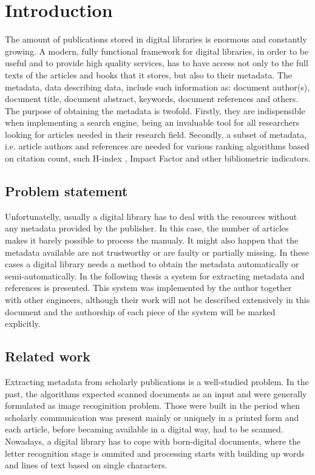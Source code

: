 \chapter{Introduction}
The amount of publications stored in digital libraries is enormous and constantly growing. A modern, fully functional framework for digital libraries, in order to be useful and to provide high quality services, has to have access not only to the full texts of the articles and books that it stores, but also to their metadata. The metadata, data describing data, include such information as: document author(s), document title, document abstract, keywords, document references and others. The purpose of obtaining the metadata is twofold. Firstly, they are indispensible when implementing a search engine, being an invaluable tool for all researchers looking for articles needed in their research field. Secondly, a subset of metadata, i.e. article authors and references are needed for various ranking algorithms based on citation count, such H-index \cite{Hirsch2005}, Impact Factor and other bibliometric indicators.
\section{Problem statement}
Unfortunatelly, usually a digital library has to deal with the resources without any metadata provided by the publisher. In this case, the number of articles makes it barely possible to process the manualy. It might also happen that the metadata available are not trustworthy or are faulty or partially missing. In these cases a digital library needs a method to obtain the metadata automatically or semi-automatically. In the following thesis a system for extracting metadata and references is presented. This system was implemented by the author together with other engineers, although their work will not be described extensively in this document and the authorship of each piece of the system will be marked explicitly. 
\section{Related work}
Extracting metadata from scholarly publications is a well-studied problem. In the past, the algorithms expected scanned documents as an input and were generally formulated as image recoginition problem. Those were built in the period when scholarly communication was present mainly or uniquely in a printed form and each article, before becaming available in a digital way, had to be scanned.
Nowadays, a digital library has to cope with born-digital documents, where the letter recognition stage is ommited and processing starts with building up words and lines of text based on single characters.


